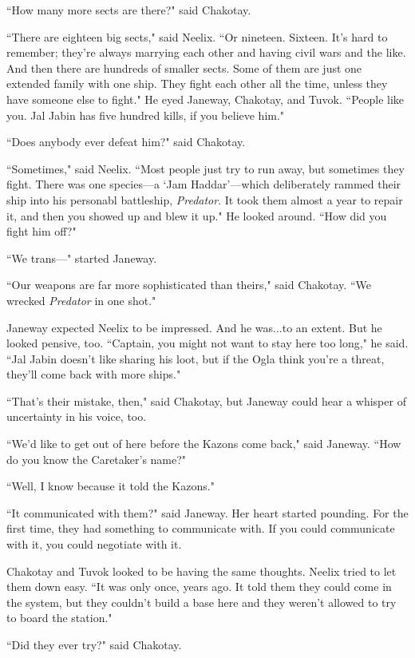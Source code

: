 \documentclass[twoside,letterpaper,12pt]{memoir}
\begin{document}
``How many more sects are there?" said Chakotay.

``There are eighteen big sects," said Neelix. ``Or nineteen. Sixteen. It's hard to remember; they're always marrying each other and having civil wars and the like. And then there are hundreds of smaller sects. Some of them are just one extended family with one ship. They fight each other all the time, unless they have someone else to fight." He eyed Janeway, Chakotay, and Tuvok. ``People like you. Jal Jabin has five hundred kills, if you believe him."

``Does anybody ever defeat him?" said Chakotay.

``Sometimes," said Neelix. ``Most people just try to run away, but sometimes they fight. There was one species---a `Jam Haddar'---which deliberately rammed their ship into his personabl battleship, \textit{Predator}. It took them almost a year to repair it, and then you showed up and blew it up." He looked around. ``How did you fight him off?"

``We trans---" started Janeway.

``Our weapons are far more sophisticated than theirs," said Chakotay. ``We wrecked \textit{Predator} in one shot."

Janeway expected Neelix to be impressed. And he was...to an extent. But he looked pensive, too. ``Captain, you might not want to stay here too long," he said. ``Jal Jabin doesn't like sharing his loot, but if the Ogla think you're a threat, they'll come back with more ships."

``That's their mistake, then," said Chakotay, but Janeway could hear a whisper of uncertainty in his voice, too.

``We'd like to get out of here before the Kazons come back," said Janeway. ``How do you know the Caretaker's name?"

``Well, I know because it told the Kazons."

``It communicated with them?" said Janeway. Her heart started pounding. For the first time, they had something to communicate with. If you could communicate with it, you could negotiate with it.

Chakotay and Tuvok looked to be having the same thoughts. Neelix tried to let them down easy. ``It was only once, years ago. It told them they could come in the system, but they couldn't build a base here and they weren't allowed to try to board the station."

``Did they ever try?" said Chakotay.
\end{document}
